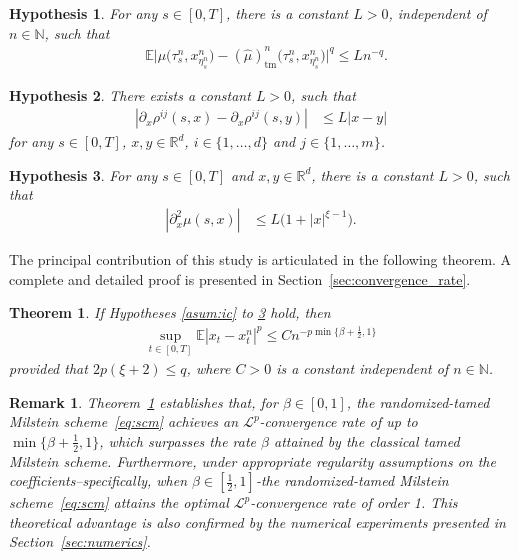 \documentclass[reqno,  oneside, 12pt]{amsart}
\newtheorem{theorem}{Theorem}[section]
\newtheorem{remark}{Remark}[section]
\newtheorem{asump}{Hypothesis}[section]
\newcommand{\E}{\mathbb E}
\begin{document}
\begin{asump} \label{asum:convergence}
	For any  $s\in[0,T]$,  there 
	is
	a constant $L>0$,   independent of $n\in\mathbb N$,    such that 
	\begin{align*}
		&\E\big|\mu\big(\tau^n_s,x_{\eta^n_s}^{n}\big) -(\widehat\mu)_{\mathrm{tm}}^{n}\big(\tau^n_s,x_{\eta^n_s}^{n}\big)\big|^{q}
		\leq L n^{-q}.
	\end{align*}
\end{asump}

\begin{asump} \label{asum:lip_first_derv_rho}
	There exists a   constant $L>0$,
	such that 
	\begin{align*}
		|\partial_x\rho^{ij}(s,x)-\partial_x\rho^{ij}(s,y)|
		&\leq L |x-y|
	\end{align*}
	for any $s\in[0,T]$, $x, y\in \mathbb R^d$, $i\in\{1,\ldots,d\}$ and $j\in\{1,\ldots,m\}$.
\end{asump}

\begin{asump} \label{asum:suplin_second_derv_mu}
	For any $s\in[0,T]$ and $x, y\in \mathbb R^d$, there is   a constant $L>0$,
	such that 
	\begin{align*}
		|\partial_x^2\mu(s,x)|
		&\leq L \big(1+|x|^{\xi-1}\big).
	\end{align*}
\end{asump}




The principal contribution of this study is articulated in the following theorem. A complete and detailed proof is presented in Section~\ref{sec:convergence_rate}.
\begin{theorem} \label{thm:main_result}
	If Hypotheses \mbox{\normalfont  \ref{asum:ic}}
	to \mbox{\normalfont  \ref{asum:suplin_second_derv_mu}} hold,
	then 
	\begin{align*}
		\sup_{ t\in[0,T]}\E|x_t-x_t^{n}|^{p}\leq  C n^{-p\min\{\beta+\frac{1}{2},1\}}
	\end{align*}
	provided that $2p(\xi+2)\leq q$, where  $C>0$ is a constant  independent of $n\in\mathbb N$.
\end{theorem}

\begin{remark}
	Theorem~\mbox{\normalfont  \ref{thm:main_result}} establishes that, for \(\beta \in [0, 1]\), the randomized-tamed Milstein scheme~\eqref{eq:scm} achieves an \(\mathscr{L}^p\)-convergence rate of up to \(\min\{\beta + \tfrac{1}{2}, 1\}\), which surpasses the rate \(\beta\) attained by the classical tamed Milstein scheme.  Furthermore, under appropriate regularity assumptions on the coefficients--specifically, when \(\beta \in [\tfrac{1}{2}, 1]\)-the randomized-tamed Milstein scheme~\eqref{eq:scm} attains the optimal \(\mathscr{L}^p\)-convergence rate of order 1. This theoretical advantage is also confirmed by the numerical experiments presented in Section~\mbox{\normalfont  \ref{sec:numerics}}.	
\end{remark}
\end{document}
